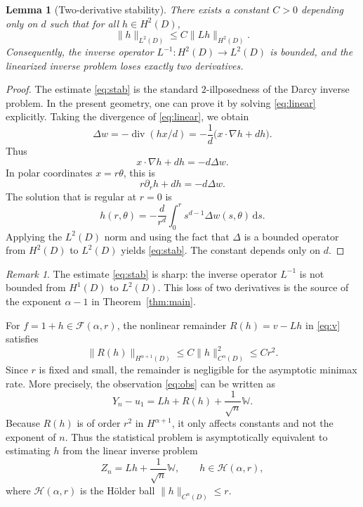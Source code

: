 \documentclass[11pt]{article}
\newtheorem{lemma}[theorem]{Lemma}
\theoremstyle{definition}
\theoremstyle{remark}
\newtheorem{remark}[theorem]{Remark}
\newcommand{\F}{\mathcal{F}}
\newcommand{\dd}{\,\mathrm{d}}
\begin{document}
\begin{lemma}[Two-derivative stability]\label{lem:stability}
There exists a constant \(C>0\) depending only on \(d\) such that for all \(h\in H^2(D)\),
\begin{equation}\label{eq:stab}
\|h\|_{L^2(D)}\le C\|Lh\|_{H^2(D)}.
\end{equation}
Consequently, the inverse operator \(L^{-1}:H^2(D)\to L^2(D)\) is bounded, and the linearized inverse problem loses exactly two derivatives.
\end{lemma}

\begin{proof}
The estimate \eqref{eq:stab} is the standard \(2\)-illposedness of the Darcy inverse problem. In the present geometry, one can prove it by solving \eqref{eq:linear} explicitly. Taking the divergence of \eqref{eq:linear}, we obtain
\[
\Delta w=-\operatorname{div}(h x/d)=-\frac{1}{d}\bigl(x\cdot\nabla h+d h\bigr).
\]
Thus
\[
x\cdot\nabla h+d h=-d\Delta w.
\]
In polar coordinates \(x=r\theta\), this is
\[
r\partial_r h+d h=-d\Delta w.
\]
The solution that is regular at \(r=0\) is
\[
h(r,\theta)=-\frac{d}{r^d}\int_0^r s^{d-1}\Delta w(s,\theta)\dd s.
\]
Applying the \(L^2(D)\) norm and using the fact that \(\Delta\) is a bounded operator from \(H^2(D)\) to \(L^2(D)\) yields \eqref{eq:stab}. The constant depends only on \(d\). 
\end{proof}

\begin{remark}
The estimate \eqref{eq:stab} is sharp: the inverse operator \(L^{-1}\) is not bounded from \(H^1(D)\) to \(L^2(D)\). This loss of two derivatives is the source of the exponent \(\alpha-1\) in Theorem~\ref{thm:main}.
\end{remark}

For \(f=1+h\in\F(\alpha,r)\), the nonlinear remainder \(R(h)=v-Lh\) in \eqref{eq:v} satisfies
\begin{equation}\label{eq:remainder}
\|R(h)\|_{H^{\alpha+1}(D)}\le C\|h\|_{C^\alpha(D)}^2\le C r^2.
\end{equation}
Since \(r\) is fixed and small, the remainder is negligible for the asymptotic minimax rate. More precisely, the observation \eqref{eq:obs} can be written as
\begin{equation}\label{eq:reduced}
Y_n-u_1=Lh+R(h)+\frac{1}{\sqrt n}\mathbb W.
\end{equation}
Because \(R(h)\) is of order \(r^2\) in \(H^{\alpha+1}\), it only affects constants and not the exponent of \(n\). Thus the statistical problem is asymptotically equivalent to estimating \(h\) from the linear inverse problem
\begin{equation}\label{eq:linobs}
Z_n=Lh+\frac{1}{\sqrt n}\mathbb W,\qquad h\in \mathcal H(\alpha,r),
\end{equation}
where \(\mathcal H(\alpha,r)\) is the Hölder ball \(\|h\|_{C^\alpha(D)}\le r\).
\end{document}
